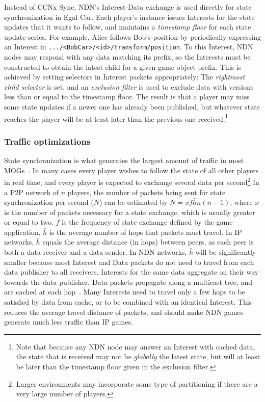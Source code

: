 \documentclass{article}
\begin{document}
Instead of CCNx Sync, NDN's Interest-Data exchange is used directly for state synchronization in Egal Car.  Each player's instance issues Interests for the state updates that it wants to follow, and maintains a \emph{timestamp floor} for each state update series. For example, Alice follows Bob's position by periodically expressing an Interest in \texttt{.../<BobCar>/<id>/transform/position}. 
To this Interest, NDN nodes may respond with any data matching its prefix, so the Interests must be constructed to obtain the latest child for a given game object prefix.  This is achieved by setting selectors in Interest packets appropriately: The \emph{rightmost child selector} is set, and an \emph{exclusion filter} is used to exclude data with versions less than or equal to the timestamp floor. The result is that a player may miss some state updates if a newer one has already been published, but whatever state reaches the player will be at least later than the previous one received.\footnote{Note that because any NDN node may answer an Interest with cached data, the state that is received may not be \emph{globally} the latest state, but will at least be later than the timestamp floor given in the exclusion filter.}


\subsubsection{Traffic optimizations}

State synchronization is what generates the largest amount of traffic in most MOGs~\cite{Upen}.  In many cases every player wishes to follow the state of all other players in real time, and every player is expected to exchange several data per second\footnote{Larger environments may incorporate some type of partitioning if there are a very large number of players.} In a P2P network of $n$ players, the number of packets being sent for state synchronization per second ($N$) can be estimated by \begin{math}N = xf\bar{h}n(n-1)\end{math}, where $x$ is the number of packets necessary for a state exchange, which is usually greater or equal to two. $f$ is the frequency of state exchange defined by the game application. $\bar{h}$ is the average number of hops that packets must travel. In IP networks, $\bar{h}$ equals the average distance (in hops) between peers, as each peer is both a data receiver and a data sender. In NDN networks, $\bar{h}$ will be significantly smaller because most Interest and Data packets do not need to travel from each data publisher to all receivers.  Interests for the same data aggregate on their way towards the data publisher, Data packets propagate along a multicast tree, and are cached at each hop~\cite{Jndn}.  Many Interests need to travel only a few hops to be satisfied by data from cache, or to be combined with an identical Interest.  This reduces the average travel distance of packets, and should make NDN games generate much less traffic than IP games.
\end{document}
